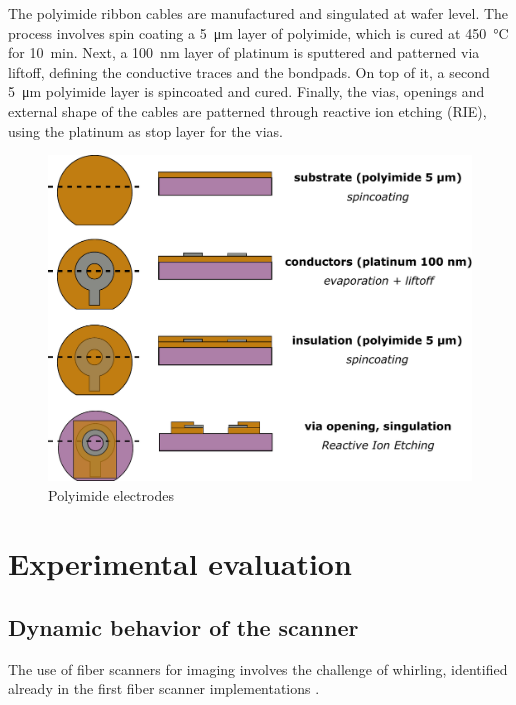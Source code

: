 \documentclass[10pt]{iopart}
\begin{document}
The polyimide ribbon cables are manufactured and singulated at wafer level. The process involves spin coating a \SI{5}{\micro\meter} layer of polyimide, which is cured at \SI{450}{\celsius} for \SI{10}{\minute}. Next, a \SI{100}{\nano\meter} layer of platinum is sputtered and patterned via liftoff, defining the conductive traces and the bondpads. On top of it, a second \SI{5}{\micro\meter} polyimide layer is spincoated and cured. Finally, the vias, openings and external shape of the cables are patterned through reactive ion etching (RIE), using the platinum as stop layer for the vias.

\begin{figure}[h!]\centering \includegraphics[width=\columnwidth]{figures/PIprocess.pdf}
      \caption{Polyimide electrodes}
\end{figure}





\section{Experimental evaluation}

\subsection{Dynamic behavior of the scanner}
\label{sec:whirling}
The use of fiber scanners for imaging involves the challenge of whirling, identified already in the first fiber scanner implementations \cite{Seibel2001}.
\end{document}
